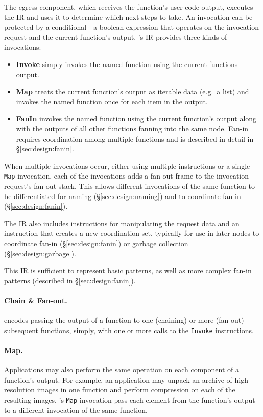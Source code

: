 The egress component, which receives the function's user-code output, executes
the IR and uses it to determine which next steps to take. An invocation can be
protected by a conditional---a boolean expression that operates on the
invocation request and the current function's output. \name{}'s IR provides
three kinds of invocations:

\begin{itemize}
  \item \textbf{Invoke} simply invokes the named function using the
        current functions output.
  \item \textbf{Map} treats the current function's output as iterable data
        (e.g.\ a list) and invokes the named function once for each item in the
        output.
  \item \textbf{FanIn} invokes the named function using the current function's
        output along with the outputs of all other functions fanning into the
        same node. Fan-in requires coordination among multiple functions and is
        described in detail in \S\ref{sec:design:fanin}.
\end{itemize}

When multiple invocations occur, either using multiple instructions or a single
\texttt{Map} invocation, each of the invocations adds a fan-out frame to the
invocation request's fan-out stack. This allows different invocations of the
same function to be differentiated for naming (\S\ref{sec:design:naming}) and to
coordinate fan-in (\S\ref{sec:design:fanin}).

The IR also includes instructions for manipulating the \name{} request data and
an instruction that creates a new coordination set, typically for use in later
nodes to coordinate fan-in (\S\ref{sec:design:fanin}) or garbage collection
(\S\ref{sec:design:garbage}).

This IR is sufficient to represent basic patterns, as well as more complex
fan-in patterns (described in \S\ref{sec:design:fanin}).

\paragraph{Chain \& Fan-out.}
\name{} encodes passing the output of a function to one (chaining) or more
(fan-out) subsequent functions, simply, with one or more calls to the
\texttt{Invoke} instructions.

\paragraph{Map.}
Applications may also perform the same operation on each component of a
function's output. For example, an application may unpack an archive of
high-resolution images in one function and perform compression on each of the
resulting images. \name{}'s \texttt{Map} invocation pass each element from the
function's output to a different invocation of the same function.

